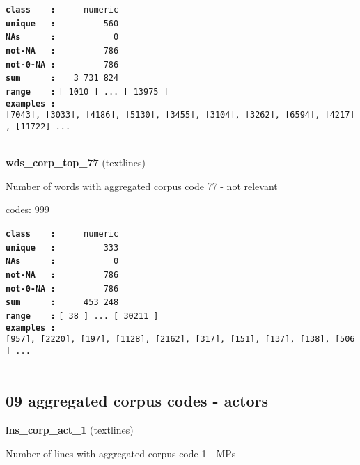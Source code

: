 \documentclass[]{article}
\begin{document}
\textbf{\texttt{class\ \ \ \ :}} \texttt{~~~~~numeric}\\
\textbf{\texttt{unique\ \ \ :}} \texttt{~~~~~~~~~560}\\
\textbf{\texttt{NAs\ \ \ \ \ \ :}} \texttt{~~~~~~~~~~~0}\\
\textbf{\texttt{not-NA\ \ \ :}} \texttt{~~~~~~~~~786}\\
\textbf{\texttt{not-0-NA\ :}} \texttt{~~~~~~~~~786}\\
\textbf{\texttt{sum\ \ \ \ \ \ :}} \texttt{~~~3~731~824}\\
\textbf{\texttt{range\ \ \ \ :}}
\texttt{{[}\ 1010\ {]}\ ...\ {[}\ 13975\ {]}}\\
\textbf{\texttt{examples\ :}}
\texttt{{[}7043{]},\ {[}3033{]},\ {[}4186{]},\ {[}5130{]},\ {[}3455{]},\ {[}3104{]},\ {[}3262{]},\ {[}6594{]},\ {[}4217{]},\ {[}11722{]}\ ...}\\

~

\textbf{wds\_corp\_top\_77} (textlines)

Number of words with aggregated corpus code 77 - not relevant

codes: 999

\textbf{\texttt{class\ \ \ \ :}} \texttt{~~~~~numeric}\\
\textbf{\texttt{unique\ \ \ :}} \texttt{~~~~~~~~~333}\\
\textbf{\texttt{NAs\ \ \ \ \ \ :}} \texttt{~~~~~~~~~~~0}\\
\textbf{\texttt{not-NA\ \ \ :}} \texttt{~~~~~~~~~786}\\
\textbf{\texttt{not-0-NA\ :}} \texttt{~~~~~~~~~786}\\
\textbf{\texttt{sum\ \ \ \ \ \ :}} \texttt{~~~~~453~248}\\
\textbf{\texttt{range\ \ \ \ :}}
\texttt{{[}\ 38\ {]}\ ...\ {[}\ 30211\ {]}}\\
\textbf{\texttt{examples\ :}}
\texttt{{[}957{]},\ {[}2220{]},\ {[}197{]},\ {[}1128{]},\ {[}2162{]},\ {[}317{]},\ {[}151{]},\ {[}137{]},\ {[}138{]},\ {[}506{]}\ ...}\\

~

\subsection{09 aggregated corpus codes -
actors}\label{aggregated-corpus-codes---actors}

\textbf{lns\_corp\_act\_1} (textlines)

Number of lines with aggregated corpus code 1 - MPs
\end{document}
